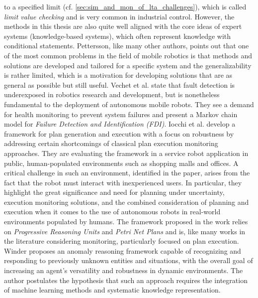 \documentclass[english, master, utf8]{base/thesis_KBS}
\begin{document}
to a specified limit (cf. \ref{sec:sim_and_mon_of_lta_challenges}), which is called \textit{limit value checking} and is very common in industrial control. \cite{Pettersson:2005} However, the methods in this thesis are also
quite well aligned with the core ideas of expert systems (knowledge-based systems), which often represent knowledge with conditional statements. \cite{Pettersson:2005} Pettersson,
like many other authors, points out that one of the most common problems in the field of mobile robotics is that methods and solutions are developed and tailored for a specific
system and the generalizability is rather limited, which is a motivation for developing solutions that are as general as possible but still useful.\newline
Vechet et al. \cite{Vechet:2015} state that fault detection is underexposed in robotics research and development, but is nonetheless fundamental to the
deployment of autonomous mobile robots. They see a demand for health monitoring to prevent system failures and present a Markov chain model for \textit{Failure Detection and
Identification (FDI)}.\newline
Iocchi et al. \cite{Iocchi:2016} develop a framework for plan generation and execution with a focus on robustness by addressing certain shortcomings of classical plan execution
monitoring approaches. They are evaluating the framework in a service robot application in public, human-populated environments such as shopping malls and offices. A critical
challenge in such an environment, identified in the paper, arises from the fact that the robot must interact with inexperienced users. In particular, they highlight the great
significance and need for planning under uncertainty, execution monitoring solutions, and the combined consideration of planning and execution when it comes to the use of
autonomous robots in real-world environments populated by humans. The framework proposed in the work relies on \textit{Progressive Reasoning Units} and \textit{Petri Net Plans}
and is, like many works in the literature considering monitoring, particularly focused on plan execution.\newline
Winder \cite{Winder:2016} proposes an anomaly reasoning framework capable of recognizing and responding to previously unknown entities and situations, with the overall goal of
increasing an agent's versatility and robustness in dynamic environments. The author postulates the hypothesis that such an approach requires the integration of machine learning
methods and systematic knowledge representation.\newline
\end{document}
